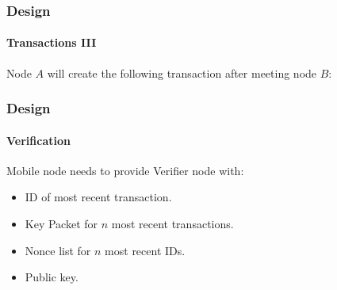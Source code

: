 \documentclass{beamer}
\begin{document}
	\begin{frame}
		\frametitle{Design}
		\framesubtitle{Transactions III}
		Node $A$ will create the following transaction after meeting node $B$:
		
		\begin{center}
		\end{center}
		\vspace{0.5cm}
		
	\end{frame}
	
	\begin{frame}
		\frametitle{Design}
		\framesubtitle{Verification}
		Mobile node needs to provide Verifier node with:
		\begin{itemize}
			\item ID of most recent transaction.
			\item Key Packet for $n$ most recent transactions.
			\item Nonce list for $n$ most recent IDs.
			\item Public key.
		\end{itemize}
	\end{frame}
	
\end{document}
